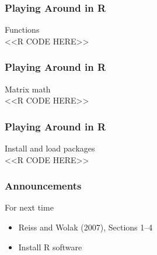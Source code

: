 \documentclass{beamer}
\begin{document}
\begin{frame}[fragile]\frametitle{Playing Around in R}
    Functions \\
    <<R CODE HERE>>
\end{frame}

\begin{frame}[fragile]\frametitle{Playing Around in R}
    Matrix math \\
    <<R CODE HERE>>
\end{frame}

\begin{frame}[fragile]\frametitle{Playing Around in R}
    Install and load packages \\
    <<R CODE HERE>>
\end{frame}

\begin{frame}\frametitle{Announcements}
    For next time
    \begin{itemize}
        \item Reiss and Wolak (2007), Sections 1--4
        \item Install R software
    \end{itemize}
\end{frame}
\end{document}
